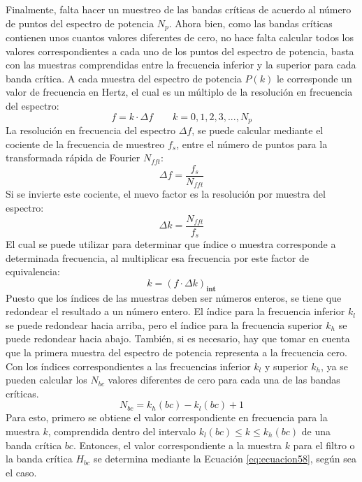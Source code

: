 \begin{enumerate}
Finalmente, falta hacer un muestreo de las bandas críticas de acuerdo al número de puntos del espectro de potencia $N_{p}.$ Ahora bien, como las bandas críticas contienen unos cuantos valores diferentes de cero, no hace falta calcular todos los valores correspondientes a cada uno de los puntos del espectro de potencia, basta con las muestras comprendidas entre la frecuencia inferior y la superior para cada banda crítica.
\vskip 0.5cm
A cada muestra del espectro de potencia $P(k)$ le corresponde un valor de frecuencia en Hertz, el cual es un múltiplo de la resolución en frecuencia del espectro:
\begin{equation}
\label{eq:ecuacion58}
f = k \cdot \Delta f
\qquad
k = 0,1,2,3,...,N_{p}
\end{equation}
La resolución en frecuencia del espectro $\Delta f$, se puede calcular mediante el cociente de la frecuencia de muestreo $f_{s}$, entre el número de puntos para la transformada rápida de Fourier $N_{fft}$:
\begin{equation}
\label{eq:ecuacion59}
\Delta f = \frac{f_{s}}{N_{fft}}
\end{equation}
Si se invierte este cociente, el nuevo factor es la resolución por muestra del espectro:
\begin{equation}
\label{eq:ecuacion60}
\Delta k = \frac{N_{fft}}{f_{s}}
\end{equation}
El cual se puede utilizar para determinar que índice o muestra corresponde a determinada frecuencia, al multiplicar esa frecuencia por este factor de equivalencia:
\begin{equation}
\label{eq:ecuacion61}
k = \left ( f \cdot \Delta k  \right )_{\mathbf{int}}
\end{equation}
Puesto que los índices de las muestras deben ser números enteros, se tiene que redondear el resultado a un número entero. El índice para la frecuencia inferior $k_{l}$ se puede redondear hacia arriba, pero el índice para la frecuencia superior $k_{h}$ se puede redondear hacia abajo. También, si es necesario, hay que tomar en cuenta que la primera muestra del espectro de potencia representa a la frecuencia cero. Con los índices correspondientes a las frecuencias inferior $k_{l}$ y superior $k_{h}$, ya se pueden calcular los $N_{bc}$ valores diferentes de cero para cada una de las bandas críticas.
\begin{equation}
\label{eq:ecuacion62}
N_{bc} = k_{h}(bc) - k_{l}(bc) + 1
\end{equation}
Para esto, primero se obtiene el valor correspondiente en frecuencia para la muestra $k$, comprendida dentro del intervalo $k_{l}(bc) \leq k \leq k_{h}(bc)$ de una banda crítica $bc$. Entonces, el valor correspondiente a la muestra $k$ para el filtro o la banda crítica $H_{bc}$ se determina mediante la Ecuación \eqref{eq:ecuacion58}, según sea el caso.


\end{enumerate}
